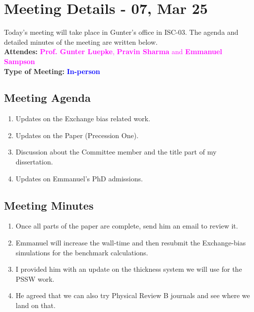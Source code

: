\section{Meeting Details - 07, Mar 25 }
\label{chap:Meeting_07}
Today's meeting will take place in Gunter's office in ISC-03. The agenda and detailed minutes of the meeting are written below.
\\ \textbf{Attendes:}
\textcolor{magenta}{\textbf{Prof. Gunter Luepke}, \textbf{Pravin Sharma} and \textbf{Emmanuel Sampson}}
\\ \textbf{Type of Meeting:}
\textcolor{blue}{\textbf{In-person} }
\subsection*{Meeting Agenda}
\begin{enumerate}
    \item Updates on the Exchange bias related work.
    \item Updates on the Paper (Precession One).
    \item Discussion about the Committee member and the title part of my dissertation.
    \item Updates on Emmanuel's PhD admissions. 
\end{enumerate}
\subsection*{Meeting Minutes}
\begin{enumerate}
    \item Once all parts of the paper are complete, send him an email to review it. 
    \item Emmanuel will increase the wall-time and then resubmit the Exchange-bias simulations for the benchmark calculations.
    \item I provided him with an update on the thickness system we will use for the PSSW work.
    \item He agreed that we can also try Physical Review B journals and see where we land on that. 
\end{enumerate}